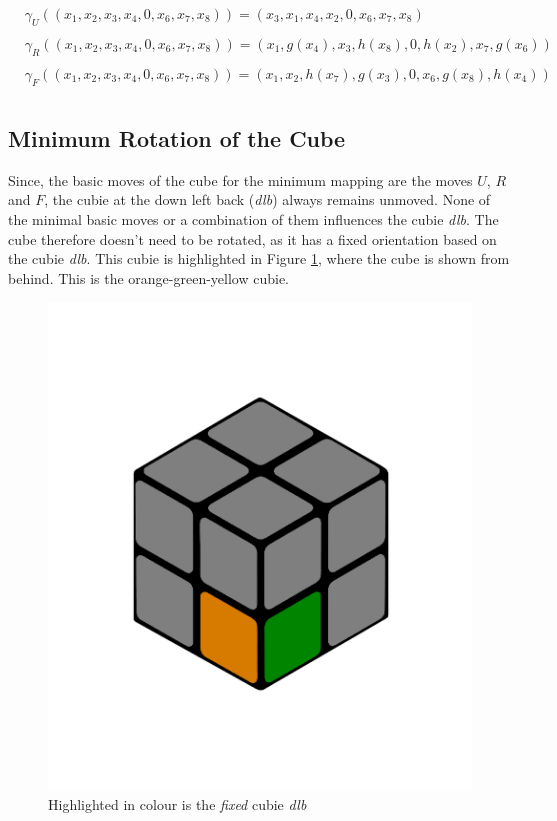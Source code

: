 \documentclass[12pt,a4paper]{article}
\theoremstyle{custom}
\begin{document}
\begin{align*}
& \gamma_U \left( (x_1, x_2, x_3, x_4, 0, x_6, x_7, x_8 ) \right) = \left( x_3, x_1, x_4, x_2, 0, x_6, x_7, x_8 \right) \\
\\
& \gamma_R \left( (x_1, x_2, x_3, x_4, 0, x_6, x_7, x_8 ) \right)  = \left( x_1, g(x_4), x_3, h(x_8), 0, h(x_2), x_7, g(x_6) \right) \\
\\
& \gamma_F \left( (x_1, x_2, x_3, x_4, 0, x_6, x_7, x_8 ) \right) = \left( x_1, x_2, h(x_7), g(x_3), 0, x_6, g(x_8), h(x_4) \right) \\
\end{align*}

\subsection{Minimum Rotation of the Cube}
\label{section_minimum_rotation}
Since, the basic moves of the cube for the minimum mapping are the moves $U$, $R$ and $F$, the cubie at the down left back (\textit{dlb}) always remains unmoved. None of the minimal basic moves or a combination of them influences the cubie \textit{dlb}.
The cube therefore doesn't need to be rotated, as it has a fixed orientation based on the cubie \textit{dlb}. This cubie is highlighted in Figure \ref{Figure_DLB}, where the cube is shown from behind. This is the orange-green-yellow cubie. 

\begin{figure}[H]
\centering
\includegraphics[scale=0.18]{DLB.png}
\caption{Highlighted in colour is the \textit{fixed} cubie \textit{dlb}}
\label{Figure_DLB}
\end{figure}
\end{document}
